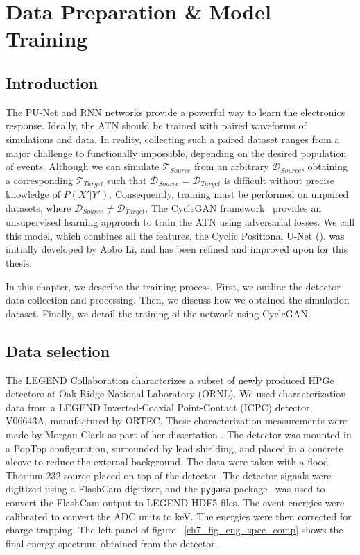 \chapter{Data Preparation \& Model Training} \label{chap:training}

\section{Introduction}
The PU-Net and RNN networks provide a powerful way to learn the electronics response. Ideally, the ATN should be trained with paired waveforms of simulations and data. In reality, collecting such a paired dataset ranges from a major challenge to functionally impossible, depending on the desired population of events. Although we can simulate $\mathcal{T}_{Source}$ from an arbitrary $\mathcal{D}_{Source}$, obtaining a corresponding $\mathcal{T}_{Target}$ such that $\mathcal{D}_{Source} = \mathcal{D}_{Target}$ is difficult without precise knowledge of $P(X'|Y')$. Consequently, training must be performed on unpaired datasets, where $\mathcal{D}_{Source} \neq \mathcal{D}_{Target}$. The CycleGAN framework~\cite{CycleGAN} provides an unsupervised learning approach to train the ATN using adversarial losses. We call this model, which combines all the features, the Cyclic Positional U-Net ({\cpunet}). {\cpunet} was initially developed by Aobo Li, and has been refined and improved upon for this thesis. 

In this chapter, we describe the {\cpunet} training process. First, we outline the detector data collection and processing. Then, we discuss how we obtained the simulation dataset. Finally, we detail the training of the network using CycleGAN.

\section{Data selection}
The LEGEND Collaboration characterizes a subset of newly produced HPGe detectors at Oak Ridge National Laboratory (ORNL). We used characterization data from a LEGEND Inverted-Coaxial Point-Contact (ICPC) detector, V06643A, manufactured by ORTEC. These characterization measurements were made by Morgan Clark as part of her dissertation \cite{clark2023phdthesis}. The detector was mounted in a PopTop configuration, surrounded by lead shielding, and placed in a concrete alcove to reduce the external background. The data were taken with a flood Thorium-232 source placed on top of the detector. The detector signals were digitized using a FlashCam digitizer, and the \texttt{pygama} package~\cite{pygama} was used to convert the FlashCam output to LEGEND HDF5 files.  The event energies were calibrated to convert the ADC units to keV. The energies were then corrected for charge trapping. The left panel of figure ~\ref{ch7_fig_eng_spec_comp} shows the final energy spectrum obtained from the detector.

